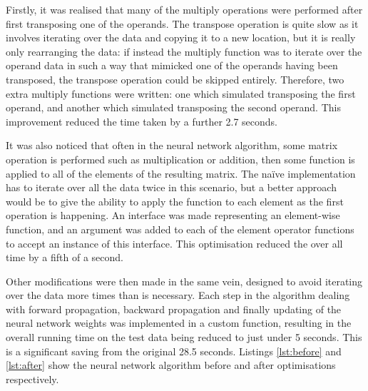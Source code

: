 Firstly, it was realised that many of the multiply operations were performed after first transposing one of the operands.  The transpose operation is quite slow as it involves iterating over the data and copying it to a new location, but it is really only rearranging the data: if instead the multiply function was to iterate over the operand data in such a way that mimicked one of the operands having been transposed, the transpose operation could be skipped entirely.  Therefore, two extra multiply functions were written: one which simulated transposing the first operand, and another which simulated transposing the second operand.  This improvement reduced the time taken by a further 2.7 seconds.

It was also noticed that often in the neural network algorithm, some matrix operation is performed such as multiplication or addition, then some function is applied to all of the elements of the resulting matrix.  The na\"{i}ve implementation has to iterate over all the data twice in this scenario, but a better approach would be to give the ability to apply the function to each element as the first operation is happening.  An interface was made representing an element-wise function, and an argument was added to each of the element operator functions to accept an instance of this interface.  This optimisation reduced the over all time by a fifth of a second.

Other modifications were then made in the same vein, designed to avoid iterating over the data more times than is necessary.  Each step in the algorithm dealing with forward propagation, backward propagation and finally updating of the neural network weights was implemented in a custom function, resulting in the overall running time on the test data being reduced to just under 5 seconds.  This is a significant saving from the original 28.5 seconds.  Listings \ref{lst:before} and \ref{lst:after} show the neural network algorithm before and after optimisations respectively.


